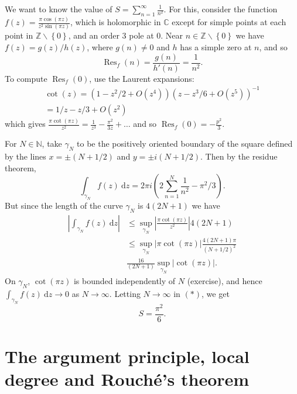 \documentclass[egregdoesnotlikesansseriftitles,a4paper]{scrartcl}
\begin{document}
\begin{example*}
      We want to know the value of $S= \sum_{n=1}^{\infty}\frac{1}{n^2}$. For this, consider the function $f (z)= \frac{\pi \cos (\pi z)}{z^2 \sin ( \pi z) }$, which is holomorphic in $\mathbb{C}$ except for simple points at each point in $\mathbb{Z} \backslash \left\{0\right\}$, and an order 3 pole at 0. Near $n \in \mathbb{Z} \backslash \left\{0\right\}$ we have $f (z)= g (z)/ h (z)$, where $g (n) \neq 0 $ and $h $ has a simple zero at $n$, and so \[
      \operatorname{Res}_{f}(n)= \frac{g (n)}{h' (n)}= \frac{1}{n^2}
      .\] To compute $\operatorname{Res}_{f} (0)$, use the Laurent expansions: 
      \begin{align*}
           \cot (z)= (1-z^2/2 + O (z^{4})) (z- z^3/6 + O (z^{5}))^{-1}\\
           = 1/z - z/3 + O (z^2)
      \end{align*}
      which gives $ \frac{\pi \cot (\pi z)}{z^2}= \frac{1}{z^{3}}- \frac{\pi^2}{3z}+ \ldots$ and so $\operatorname{Res}_{f}(0)=- \frac{p^2}{3}$. 

      For $N \in \mathbb{N}$, take $\gamma_{N}$ to be the positively oriented boundary of the square defined by the lines $x= \pm (N+1/2)$ and $y= \pm i (N +1/2)$. Then by the residue theorem, 
      \begin{equation}\tag{$\ast$}
            \int_{\gamma_{N}}^{}f (z) \ \mathrm{d} z = 2 \pi i \left(2 \sum_{n=1}^{N}\frac{1}{n^2} - \pi^2/3\right).
      \end{equation}
      But since the length of the curve $\gamma_{N}$ is $4 (2N+1)$ we have 
      \begin{align*}
           \left|\int_{\gamma_{N}}^{}f (z) \ \mathrm{d}z \right| &\leq \sup_{\gamma_{N}} \left| \frac{\pi \cot (\pi z)}{z^2}\right|4 (2N+1)\\
           &\leq \sup_{\gamma_{N}} \left|\pi \cot (\pi z)\right| \frac{4 (2N+1) \pi}{(N+1/2)^2}\\
           & \frac{16}{(2N+1)}\sup_{\gamma_{N}}\left|\cot (\pi z)\right|.
      \end{align*}
      On $\gamma_{N}$, $\cot (\pi z)$ is bounded independently of $N$ (exercise), and hence $\int_{\gamma_{N}}^{}f (z) \ \mathrm{d}z \rightarrow 0 $ as $N \rightarrow \infty$. Letting $N \rightarrow \infty$ in $(\ast)$, we get \[
      S= \frac{\pi^2}{6}
      .\]
\end{example*}
\section{The argument principle, local degree and Rouché's theorem}
\end{document}
